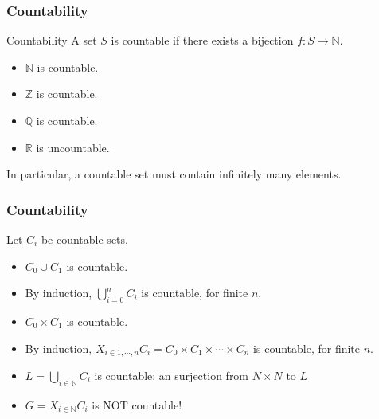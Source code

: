 \documentclass{beamer}
\begin{document}
\begin{frame}
\frametitle{Countability}

\begin{block}{Countability}
A set $S$ is countable if there exists a bijection $f: S \rightarrow \mathbb{N}$.
\end{block}

\begin{itemize}
    \item $\mathbb{N}$ is countable.
    \item $\mathbb{Z}$ is countable.
    \item $\mathbb{Q}$ is countable.
    \item $\mathbb{R}$ is uncountable.
\end{itemize}

In particular, a countable set must contain infinitely many elements.



%
\end{frame}

%
%
%
%
%

\begin{frame}
\frametitle{Countability}

Let $C_i$ be countable sets.

\begin{itemize}
  \item $C_0 \cup C_1$ is countable.
  \item By induction, $\bigcup_{i=0}^n C_i$ is countable, for finite $n$.
  \item $C_0 \times C_1$ is countable.
  \item By induction, $X_{i\in 1, \cdots , n} C_i = C_0\times C_1 \times \cdots \times C_n$ is countable, for finite $n$.
  \item $L=\bigcup_{i\in \mathbb{N}} C_i$ is countable: an surjection from $N\times N $ to $L$ 
  \item $G=X_{i\in \mathbb{N}} C_i$ is \alert{NOT} countable!
\end{itemize}
\end{frame}
\end{document}
